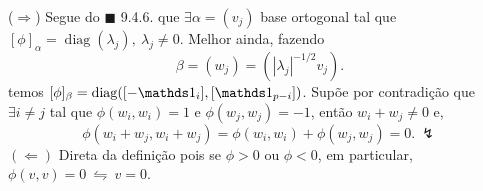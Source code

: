 \textcolor{gris}{
(\(\Rightarrow\)) Segue do \(\blacksquare\) 9.4.6. que \(\exists \alpha = (v_j)\) base ortogonal tal que \([\phi]_{\alpha} = \operatorname{diag}(\lambda_j), \ \lambda_j \neq 0\). Melhor ainda, fazendo 
\[\beta = (w_j) = (|\lambda_j|^{-1  /2}v_j). \]   
temos \([\phi]_{\beta} = \operatorname{diag}([-\id_i], [\id_{p-i}])\). Supõe por contradição que \(\exists i \neq j\) tal que \(\phi(w_i, w_i) =1\) e \(\phi(w_j, w_j) = -1\), então \(w_i + w_j \neq 0 \) e, 
\[
    \phi(w_i + w_j ,  w_i + w_j) = \phi(w_i, w_i) + \phi(w_j, w_j) = 0. \ \lightning 
\]
\((\Leftarrow)\) Direta da definição pois se \(\phi> 0\) ou \( \phi <0 \), em particular, \(\phi(v,v) = 0 \ \leftrightharpoons \ v = 0\).   
}


